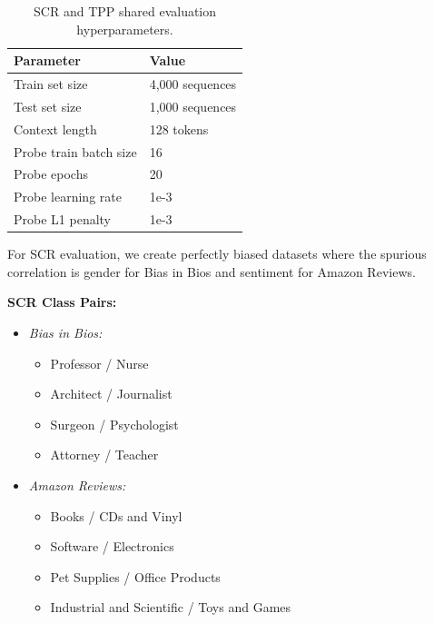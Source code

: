 \documentclass{article}
\theoremstyle{plain}
\theoremstyle{definition}
\theoremstyle{remark}
\begin{document}
\begin{table}[h!]
    \centering
    \begin{tabular}{|l|l|}
        \hline
        \textbf{Parameter}             & \textbf{Value}                  \\ \hline
        Train set size                 & 4,000 sequences                 \\ \hline
        Test set size                  & 1,000 sequences                 \\ \hline
        Context length                 & 128 tokens                      \\ \hline
        Probe train batch size         & 16                              \\ \hline
        Probe epochs                   & 20                              \\ \hline
        Probe learning rate            & 1e-3                             \\ \hline
        Probe L1 penalty               & 1e-3                             \\ \hline
    \end{tabular}
    \caption{SCR and TPP shared evaluation hyperparameters.}
    \label{tab:scr-tpp-shared-parameters}
\end{table}

For SCR evaluation, we create perfectly biased datasets where the spurious correlation is gender for Bias in Bios and sentiment for Amazon Reviews.

\textbf{SCR Class Pairs:}
\begin{itemize}
\item \textit{Bias in Bios:}
\begin{itemize}
\item Professor / Nurse
\item Architect / Journalist
\item Surgeon / Psychologist
\item Attorney / Teacher
\end{itemize}
\item \textit{Amazon Reviews:}
\begin{itemize}
\item Books / CDs and Vinyl
\item Software / Electronics
\item Pet Supplies / Office Products
\item Industrial and Scientific / Toys and Games
\end{itemize}
\end{itemize}
\end{document}
